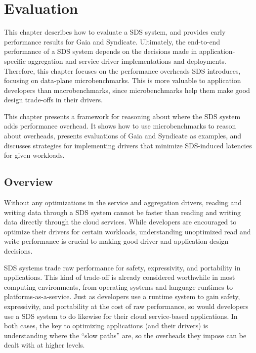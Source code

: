 \chapter{Evaluation}
\label{chap:evaluation}

This chapter describes how to evaluate a SDS system, and provides early
performance results for Gaia and Syndicate.
Ultimately, the end-to-end performance of a SDS system depends on the decisions made in
application-specific aggregation and service driver implementations and
deployments.  Therefore, this chapter focuses on the performance overheads SDS
introduces, focusing on data-plane microbenchmarks.
This is more valuable to application developers than macrobenchmarks,
since microbenchmarks help them make good
design trade-offs in their drivers.

This chapter presents a framework for reasoning about where the SDS system adds
performance overhead.  It shows how to use microbenchmarks to reason about
overheads, presents evaluations of Gaia and Syndicate as examples, and 
discusses strategies for implementing drivers that minimize
SDS-induced latencies for given workloads.




\section{Overview}

Without any optimizations in the service and aggregation drivers,
reading and writing data through a SDS system cannot
be faster than reading and writing data directly through the cloud services.
While developers are encouraged to optimize their drivers
for certain workloads, understanding unoptimized read and write performance
is crucial to making good driver and application design decisions.

SDS systems trade raw performance for safety, expressivity, and portability in applications. 
This kind of trade-off is already considered worthwhile in most computing
environments, from operating systems and language runtimes to
platforms-as-a-service.  Just as developers use a runtime system to
gain safety, expressivity, and portability at the cost of raw
performance, so would developers use a SDS system to do likewise for their
cloud service-based applications.  In both cases, the key to optimizing
applications (and their drivers) is understanding where the ``slow paths'' are,
so the overheads they impose can be dealt with at higher levels.

